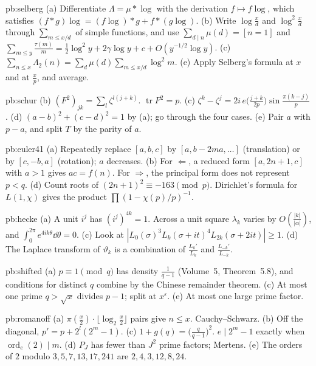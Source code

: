 \begin{hint}{pb:selberg}
(a) Differentiate $\Lambda=\mu*\log$ with the derivation $f\mapsto f\log$, which satisfies $(f*g)\log=(f\log)*g+f*(g\log)$. (b) Write $\log\frac xd$ and $\log^2\frac xd$ through
$\sum_{m\le x/d}$ of simple functions, and use $\sum_{d\mid n}\mu(d)=[n=1]$ and $\sum_{m\le y}\frac{\tau(m)}m=\frac12\log^2y+2\gamma\log y+c+O(y^{-1/2}\log y)$. (c) $\sum_{n\le x}\Lambda_2(n)=\sum_d\mu(d)\sum_{m\le x/d}\log^2m$.
(e) Apply Selberg's formula at $x$ and at $\frac xp$, and average.
\end{hint}

\begin{hint}{pb:schur}
(b) $(F^2)_{jk}=\sum_l\zeta^{l(j+k)}$. $\operatorname{tr}F^2=p$. (c) $\zeta^k-\zeta^j=2i\,e\bigl(\frac{j+k}{2p}\bigr)\sin\frac{\pi(k-j)}p$. (d) $(a-b)^2+(c-d)^2=1$ by (a); go through the
four cases. (e) Pair $a$ with $p-a$, and split $T$ by the parity of $a$.
\end{hint}

\begin{hint}{pb:euler41}
(a) Repeatedly replace $[a,b,c]$ by $[a,b-2ma,\dots]$ (translation) or by $[c,-b,a]$ (rotation); $a$ decreases. (b) For $\Leftarrow$, a reduced form $[a,2n+1,c]$ with $a>1$ gives
$ac=f(n)$. For $\Rightarrow$, the principal form does not represent $p<q$. (d) Count roots of $(2n+1)^2\equiv-163\pmod p$. Dirichlet's formula for $L(1,\chi)$ gives the
product $\prod(1-\chi(p)/p)^{-1}$.
\end{hint}

\begin{hint}{pb:hecke}
(a) A unit $i^j$ has $(i^j)^{4k}=1$. Across a unit square $\lambda_k$ varies by $O(\frac{|k|}{|\alpha|})$, and $\int_0^{2\pi}e^{4ik\theta}\dd\theta=0$. (c) Look at
$|L_0(\sigma)^3L_k(\sigma+it)^4L_{2k}(\sigma+2it)|\ge1$. (d) The Laplace transform of $\vartheta_k$ is a combination of $\frac{L_k'}{L_k}$ and $\frac{L_{-k}'}{L_{-k}}$.
\end{hint}

\begin{hint}{pb:shifted}
(a) $p\equiv1\pmod q$ has density $\frac1{q-1}$ (Volume~5, Theorem~5.8), and conditions for distinct $q$ combine by the Chinese remainder theorem. (c) At most one prime
$q>\sqrt x$ divides $p-1$; split at $x^\varepsilon$. (e) At most one large prime factor.
\end{hint}

\begin{hint}{pb:romanoff}
(a) $\pi(\frac x2)\cdot\lfloor\log_2\frac x2\rfloor$ pairs give $n\le x$. Cauchy--Schwarz. (b) Off the diagonal, $p'=p+2^l(2^m-1)$. (c) $1+g(q)=\bigl(\frac q{q-1}\bigr)^2$.
$e\mid2^m-1$ exactly when $\operatorname{ord}_e(2)\mid m$. (d) $P_J$ has fewer than $J^2$ prime factors; Mertens. (e) The orders of $2$ modulo $3,5,7,13,17,241$ are
$2,4,3,12,8,24$.
\end{hint}

